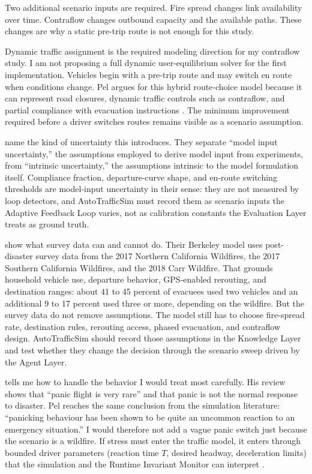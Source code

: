 \begin{bibunit}[plainnat]
Two additional scenario inputs are required. Fire spread changes link
availability over time. Contraflow changes outbound capacity and the available
paths. These changes are why a static pre-trip route is not enough for this
study.

Dynamic traffic assignment is the required modeling direction for my
contraflow study. I am not proposing a full dynamic user-equilibrium solver for
the first implementation. Vehicles begin with a pre-trip route and may switch
en route when conditions change. Pel argues for this hybrid route-choice model
because it can represent road closures, dynamic traffic controls such as
contraflow, and partial compliance with evacuation instructions
\citep{pel2012evacuationbehavior}. The minimum improvement required before a
driver switches routes remains visible as a scenario assumption.

\citet{ronchi2014uncertainty} name the kind of uncertainty this introduces.
They separate ``model input uncertainty,'' the assumptions employed to
derive model input from experiments, from ``intrinsic uncertainty,'' the
assumptions intrinsic to the model formulation itself. Compliance fraction,
departure-curve shape, and en-route switching thresholds are model-input
uncertainty in their sense: they are not measured by loop detectors, and
AutoTrafficSim must record them as scenario inputs the Adaptive Feedback
Loop varies, not as calibration constants the Evaluation Layer treats as
ground truth.

\citet{zhao2021berkeleywildfire} show what survey data can and cannot do.
Their Berkeley model uses post-disaster survey data from the 2017 Northern
California Wildfires, the 2017 Southern California Wildfires, and the 2018
Carr Wildfire. That grounds household vehicle use, departure behavior,
GPS-enabled rerouting, and destination ranges: about 41 to 45 percent of
evacuees used two vehicles and an additional 9 to 17 percent used three or
more, depending on the wildfire. But the survey data do not remove
assumptions. The model still has to choose fire-spread rate, destination
rules, rerouting access, phased evacuation, and contraflow design.
AutoTrafficSim should record those assumptions in the Knowledge Layer and
test whether they change the decision through the scenario sweep driven by
the Agent Layer.

\citet{quarantelli2001panic} tells me how to handle the behavior I would
treat most carefully. His review shows that ``panic flight is very rare''
and that panic is not the normal response to disaster. Pel reaches the same
conclusion from the simulation literature: ``panicking behaviour has been
shown to be quite an uncommon reaction to an emergency situation.'' I would
therefore not add a vague panic switch just because the scenario is a
wildfire. If stress must enter the traffic model, it enters through bounded
driver parameters (reaction time $T$, desired headway, deceleration limits)
that the simulation and the Runtime Invariant Monitor can interpret
\citep{treiber2013book}.



\end{bibunit}
